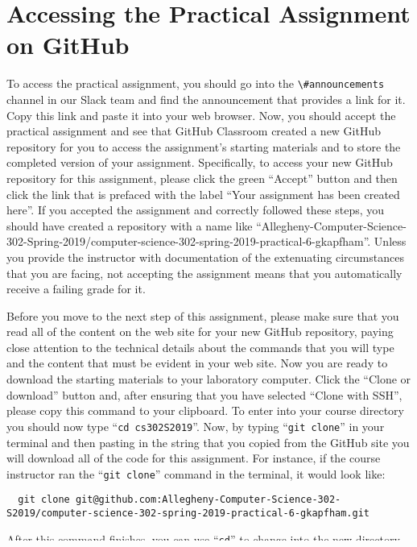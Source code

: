 \documentclass[11pt]{article}
\newcommand{\command}[1]{``\lstinline{#1}''}
\newcommand{\channel}[1]{\lstinline{#1}}
\newcommand{\step}[1]{``{#1}''}
\begin{document}
\section*{Accessing the Practical Assignment on GitHub}

To access the practical assignment, you should go into the
\channel{\#announcements} channel in our Slack team and find the announcement
that provides a link for it. Copy this link and paste it into your web browser.
Now, you should accept the practical assignment and see that GitHub Classroom
created a new GitHub repository for you to access the assignment's starting
materials and to store the completed version of your assignment. Specifically,
to access your new GitHub repository for this assignment, please click the green
``Accept'' button and then click the link that is prefaced with the label ``Your
assignment has been created here''. If you accepted the assignment and correctly
followed these steps, you should have created a repository with a name like
``Allegheny-Computer-Science-302-Spring-2019/computer-science-302-spring-2019-practical-6-gkapfham''.
Unless you provide the instructor with documentation of the extenuating
circumstances that you are facing, not accepting the assignment means that you
automatically receive a failing grade for it.

Before you move to the next step of this assignment, please make sure that you
read all of the content on the web site for your new GitHub repository, paying
close attention to the technical details about the commands that you will type
and the content that must be evident in your web site. Now you are ready to
download the starting materials to your laboratory computer. Click the ``Clone
or download'' button and, after ensuring that you have selected ``Clone with
SSH'', please copy this command to your clipboard. To enter into your course
directory you should now type \command{cd cs302S2019}. Now, by typing
\command{git clone} in your terminal and then pasting in the string that you
copied from the GitHub site you will download all of the code for this
assignment. For instance, if the course instructor ran the \command{git clone}
command in the terminal, it would look like:

\begin{lstlisting}
  git clone git@github.com:Allegheny-Computer-Science-302-S2019/computer-science-302-spring-2019-practical-6-gkapfham.git
\end{lstlisting}

After this command finishes, you can use \command{cd} to change into the new
directory. If you want to \step{go back} one directory from your current
location, then you can type the command \command{cd ..}. Please continue to use
the \command{cd} and \command{ls} commands to explore the files that you
automatically downloaded from GitHub. What files and directories do you see? In
what ways will you have to extend them? Please note that this assignment
furnishes HTML and CSS files with minimal starting content. Spend some time
exploring these files, sharing your discoveries with the \mbox{course
instructor}.
\end{document}
